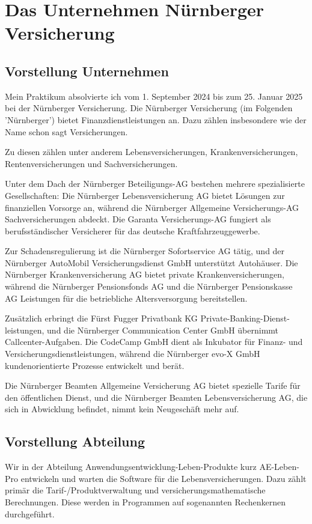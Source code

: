 \chapter{Das Unternehmen Nürnberger Versicherung}\label{ch:intro}


\section{Vorstellung Unternehmen}
Mein Praktikum absolvierte ich vom 1. September 2024 bis zum 25. Januar 2025 bei der Nürnberger Versicherung.
Die Nürnberger Versicherung (im Folgenden 'Nürnberger') bietet Finanzdienstleistungen an.
Dazu zählen insbesondere wie der Name schon sagt Versicherungen.


Zu diesen zählen unter anderem Lebensversicherungen, Krankenversicherungen, Rentenversicherungen und Sachversicherungen.

Unter dem Dach der Nürnberger Beteiligungs-AG bestehen mehrere spezialisierte Gesellschaften: Die Nürnberger Lebensversicherung AG bietet Lösungen zur finanziellen Vorsorge an, während die Nürnberger Allgemeine Versicherungs-AG Sachversicherungen abdeckt. Die Garanta Versicherungs-AG fungiert als berufsständischer Versicherer für das deutsche Kraftfahrzeuggewerbe.

Zur Schadensregulierung ist die Nürnberger Sofortservice AG tätig, und der Nürnberger AutoMobil Versicherungsdienst GmbH unterstützt Autohäuser. Die Nürnberger Krankenversicherung AG bietet private Krankenversicherungen, während die Nürnberger Pensionsfonds AG und die Nürnberger Pensionskasse AG Leistungen für die betriebliche Altersversorgung bereitstellen.

Zusätzlich erbringt die Fürst Fugger Privatbank KG Private-Banking-Dienst-leistungen, und die Nürnberger Communication Center GmbH übernimmt Callcenter-Aufgaben. 
Die CodeCamp GmbH dient als Inkubator für Finanz- und Versicherungsdienstleistungen, während die Nürnberger evo-X GmbH kundenorientierte Prozesse entwickelt und berät.

Die Nürnberger Beamten Allgemeine Versicherung AG bietet spezielle Tarife für den öffentlichen Dienst, und die Nürnberger Beamten Lebensversicherung AG, die sich in Abwicklung befindet, nimmt kein Neugeschäft mehr auf.\cite{NürnbergerWiki2024}
\section{Vorstellung Abteilung}
Wir in der Abteilung Anwendungsentwicklung-Leben-Produkte kurz AE-Leben-Pro entwickeln und warten die Software für die Lebensversicherungen.
Dazu zählt primär die Tarif-/Produktverwaltung und versicherungsmathematische Berechnungen. 
Diese werden in Programmen auf sogenannten Rechenkernen durchgeführt.

